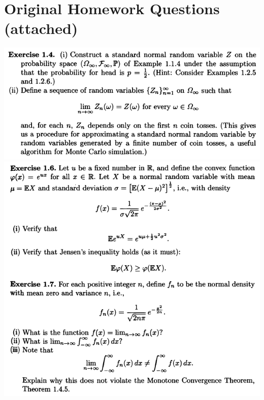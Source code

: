 \documentclass[final,3p,authoryear]{elsarticle}
\begin{document}
\section{Original Homework Questions (attached)}
%	
	\includegraphics[width=14cm]{Exercise1p4.png}\\
	\includegraphics[width=14cm]{Exercise1p61p7.png}


%
%
%
	
	
%
%
%
%
%
%
\end{document}
